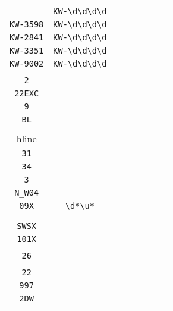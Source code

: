 \begin{longtable}{cccccccc}
\begin{tabular}{ll}
    \verb|KW-9597| & \verb|KW-\d\d\d\d|\\
\verb|KW-3598| & \verb|KW-\d\d\d\d|\\
\verb|KW-2841| & \verb|KW-\d\d\d\d|\\
\verb|KW-3351| & \verb|KW-\d\d\d\d|\\
\verb|KW-9002| & \verb|KW-\d\d\d\d|
\end{tabular}
\\\midrule 
\begin{tabular}{l}
    \verb|22G|\\
\verb|2|\\
\verb|22EXC|\\
\verb|9|\\
\verb|BL|\\
\\hline\\
\verb|31|\\
\verb|34|\\
\verb|3|\\
\verb|N_W04|\\
\verb|09X|
\end{tabular}

&
\verb|\d*\u*|
&

\begin{tabular}{l}
    \verb|(\d)*(\u)*|\\
\verb||\\
\verb||\\
\verb|SWSX|\\
\verb|101X|\\
\verb||
\end{tabular}

&

\begin{tabular}{l}
    \verb|(2)*(\u)*(\d)*|\\
\verb|26|\\
\verb||\\
\verb|22|\\
\verb|997|\\
\verb|2DW|
\end{tabular}

&


\end{longtable}
